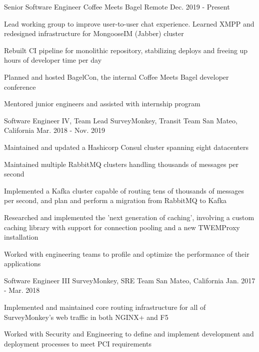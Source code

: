 \begin{cventries}
  \cventry
    {Senior Software Engineer}
    {Coffee Meets Bagel}
    {Remote}
    {Dec. 2019 - Present}
    {
        \begin{cvitems}
          \item {Lead working group to improve user-to-user chat experience. Learned XMPP and redesigned infrastructure for MongooseIM (Jabber) cluster}
          \item {Rebuilt CI pipeline for monolithic repository, stabilizing deploys and freeing up hours of developer time per day}
          \item {Planned and hosted BagelCon, the internal Coffee Meets Bagel developer conference}
          \item {Mentored junior engineers and assisted with internship program}
        \end{cvitems}
    }
  \cventry
    {Software Engineer IV, Team Lead}
    {SurveyMonkey, Transit Team}
    {San Mateo, California}
    {Mar. 2018 - Nov. 2019}
    {
      \begin{cvitems}
        \item {Maintained and updated a Hashicorp Consul cluster spanning eight datacenters}
        \item {Maintained multiple RabbitMQ clusters handling thousands of messages per second}
        \item {Implemented a Kafka cluster capable of routing tens of thousands of messages per second, and plan and perform a migration from RabbitMQ to Kafka}
        \item {Researched and implemented the 'next generation of caching', involving a custom caching library with support for connection pooling and a new TWEMProxy installation}
        \item {Worked with engineering teams to profile and optimize the performance of their applications}
      \end{cvitems}
    }
  \cventry
    {Software Engineer III}
    {SurveyMonkey, SRE Team}
    {San Mateo, California}
    {Jan. 2017 - Mar. 2018}
    {
      \begin{cvitems}
        \item {Implemented and maintained core routing infrastructure for all of SurveyMonkey's web traffic in both NGINX+ and F5}
        \item {Worked with Security and Engineering to define and implement development and deployment processes to meet PCI requirements}

\end{cvitems}}
\end{cventries}
